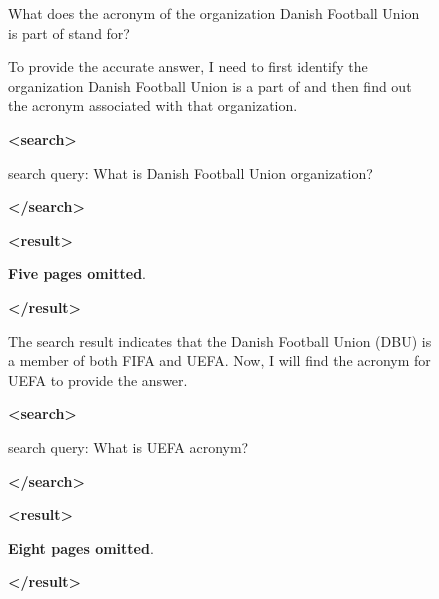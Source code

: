 \documentclass{article}
\begin{document}
\begin{figure}[h]
\centering
 
\begin{tcolorbox}[
    colback=gray!5!white, 
    colframe=brown!75!brown, 
    title=Case-2 from Musique, 
    boxrule=0.3mm, 
    width=\linewidth,  
    arc=2mm, 
    auto outer arc=true
]
What does the acronym of the organization Danish Football Union is part of stand for?
\end{tcolorbox}

\vspace{0.2cm}   

\begin{minipage}[t]{0.48\linewidth}  
    \begin{tcolorbox}[
        colback=gray!5!white, 
        colframe=red!75!brown, 
        title=Wrong Rollout, 
        boxrule=0.3mm, 
        width=\linewidth, 
        arc=2mm, 
        height=18cm,
        auto outer arc=true,
        top=2mm, bottom=2mm, left=2mm, right=2mm  
    ]
    To provide the accurate answer, I need to first identify the organization  Danish Football Union is a part of and then find out the acronym associated 
    with that organization.

    \textcolor{mydarkred}{\textbf{<search>}}
    
    search query: What is Danish Football Union organization?
    
    \textcolor{mydarkred}{\textbf{</search>}}
    
    \textbf{<result>}
    
    \textbf{Five pages omitted}.

    \textbf{</result>}

    The search result indicates that the Danish Football Union (DBU) is a member 
    of both FIFA and UEFA. Now, I will find the acronym for UEFA to provide the answer.

    \textcolor{mydarkred}{\textbf{<search>}}
    
    search query: What is UEFA acronym?
    
    \textcolor{mydarkred}{\textbf{</search>}}
    
    \textbf{<result>}
    
    \textbf{Eight pages omitted}.

    \textbf{</result>}


\end{tcolorbox}
\end{minipage}
\end{figure}
\end{document}
